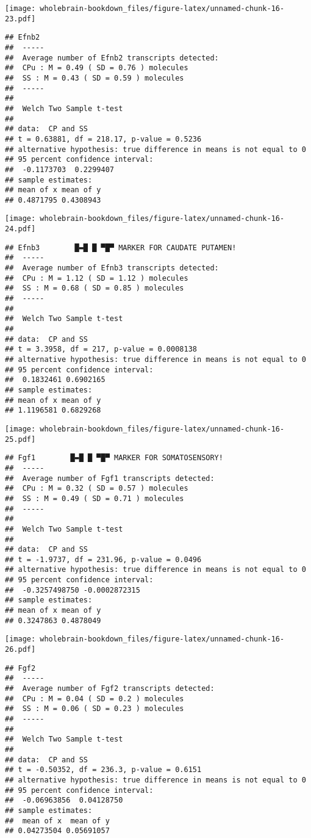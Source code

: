\documentclass[]{book}
\theoremstyle{definition}
\theoremstyle{definition}
\theoremstyle{remark}
\begin{document}
\texttt{[image: wholebrain-bookdown\_files/figure-latex/unnamed-chunk-16-23.pdf]}

\begin{verbatim}
## Efnb2
##  -----
##  Average number of Efnb2 transcripts detected:
##  CPu : M = 0.49 ( SD = 0.76 ) molecules 
##  SS : M = 0.43 ( SD = 0.59 ) molecules
##  -----
## 
##  Welch Two Sample t-test
## 
## data:  CP and SS
## t = 0.63881, df = 218.17, p-value = 0.5236
## alternative hypothesis: true difference in means is not equal to 0
## 95 percent confidence interval:
##  -0.1173703  0.2299407
## sample estimates:
## mean of x mean of y 
## 0.4871795 0.4308943
\end{verbatim}

\texttt{[image: wholebrain-bookdown\_files/figure-latex/unnamed-chunk-16-24.pdf]}

\begin{verbatim}
## Efnb3        █▬█ █ ▀█▀ MARKER FOR CAUDATE PUTAMEN!
##  -----
##  Average number of Efnb3 transcripts detected:
##  CPu : M = 1.12 ( SD = 1.12 ) molecules 
##  SS : M = 0.68 ( SD = 0.85 ) molecules
##  -----
## 
##  Welch Two Sample t-test
## 
## data:  CP and SS
## t = 3.3958, df = 217, p-value = 0.0008138
## alternative hypothesis: true difference in means is not equal to 0
## 95 percent confidence interval:
##  0.1832461 0.6902165
## sample estimates:
## mean of x mean of y 
## 1.1196581 0.6829268
\end{verbatim}

\texttt{[image: wholebrain-bookdown\_files/figure-latex/unnamed-chunk-16-25.pdf]}

\begin{verbatim}
## Fgf1        █▬█ █ ▀█▀ MARKER FOR SOMATOSENSORY!
##  -----
##  Average number of Fgf1 transcripts detected:
##  CPu : M = 0.32 ( SD = 0.57 ) molecules 
##  SS : M = 0.49 ( SD = 0.71 ) molecules
##  -----
## 
##  Welch Two Sample t-test
## 
## data:  CP and SS
## t = -1.9737, df = 231.96, p-value = 0.0496
## alternative hypothesis: true difference in means is not equal to 0
## 95 percent confidence interval:
##  -0.3257498750 -0.0002872315
## sample estimates:
## mean of x mean of y 
## 0.3247863 0.4878049
\end{verbatim}

\texttt{[image: wholebrain-bookdown\_files/figure-latex/unnamed-chunk-16-26.pdf]}

\begin{verbatim}
## Fgf2
##  -----
##  Average number of Fgf2 transcripts detected:
##  CPu : M = 0.04 ( SD = 0.2 ) molecules 
##  SS : M = 0.06 ( SD = 0.23 ) molecules
##  -----
## 
##  Welch Two Sample t-test
## 
## data:  CP and SS
## t = -0.50352, df = 236.3, p-value = 0.6151
## alternative hypothesis: true difference in means is not equal to 0
## 95 percent confidence interval:
##  -0.06963856  0.04128750
## sample estimates:
##  mean of x  mean of y 
## 0.04273504 0.05691057
\end{verbatim}
\end{document}
